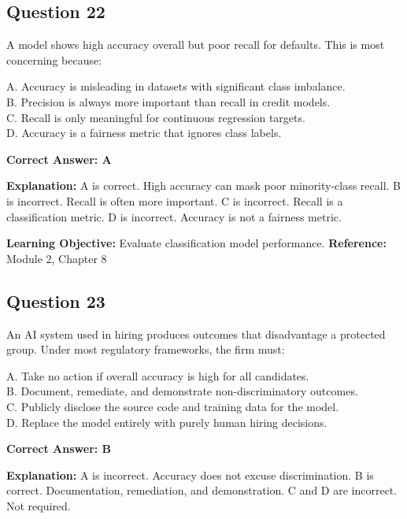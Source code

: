 \documentclass[11pt]{article}
\begin{document}
	\subsection*{Question 22}
	A model shows high accuracy overall but poor recall for defaults. This
	is most concerning because:
	
	A. Accuracy is misleading in datasets with significant class imbalance.\\
	B. Precision is always more important than recall in credit models.\\
	C. Recall is only meaningful for continuous regression targets.\\
	D. Accuracy is a fairness metric that ignores class labels.
	
	\vspace{0.4em}
	\textbf{Correct Answer: A}
	
	\textbf{Explanation:}
	A is correct. High accuracy can mask poor minority-class recall.
	B is incorrect. Recall is often more important.
	C is incorrect. Recall is a classification metric.
	D is incorrect. Accuracy is not a fairness metric.
	
	\textbf{Learning Objective:} Evaluate classification model performance.
	\textbf{Reference:} Module 2, Chapter 8
	
	\subsection*{Question 23}
	An AI system used in hiring produces outcomes that disadvantage a
	protected group. Under most regulatory frameworks, the firm must:
	
	A. Take no action if overall accuracy is high for all candidates.\\
	B. Document, remediate, and demonstrate non-discriminatory outcomes.\\
	C. Publicly disclose the source code and training data for the model.\\
	D. Replace the model entirely with purely human hiring decisions.
	
	\vspace{0.4em}
	\textbf{Correct Answer: B}
	
	\textbf{Explanation:}
	A is incorrect. Accuracy does not excuse discrimination.
	B is correct. Documentation, remediation, and demonstration.
	C and D are incorrect. Not required.
	
\end{document}
